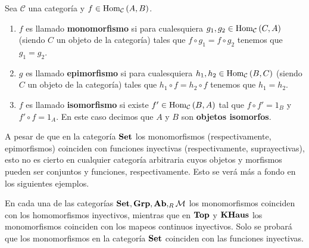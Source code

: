 \documentclass[12pt]{report}
\theoremstyle{largebreak}
\newcommand{\Hom}[3]{\ensuremath{\textup{Hom}_{#1}\left(#2,#3\right)}}
\newcommand{\Cat}[1]{\ensuremath{\textup{\textbf{#1}}}}
\begin{document}
    \begin{mydef}
        Sea $\mathcal{C}$ una categoría y $f\in\Hom{\mathcal{C}}{A}{B}$.
        \begin{enumerate}
            \item $f$ es llamado \textbf{monomorfismo} si para cualesquiera $g_1,g_2\in\Hom{\mathcal{C}}{C}{A}$ (siendo $C$ un objeto de la categoría) tales que $f\circ g_1=f\circ g_2$ tenemos que $g_1=g_2$.
            \item $g$ es llamado \textbf{epimorfismo} si para cualesquiera $h_1,h_2\in\Hom{\mathcal{C}}{B}{C}$ (siendo $C$ un objeto de la categoría) tales que $h_1\circ f=h_2\circ f$ tenemos que $h_1=h_2$.
            \item $f$ es llamado \textbf{isomorfismo} si existe $f'\in\Hom{\mathcal{C}}{B}{A}$ tal que $f\circ f'=1_B$ y $f'\circ f=1_A$. En este caso decimos que $A$ y $B$ son \textbf{objetos isomorfos}.
        \end{enumerate}
    \end{mydef}

    A pesar de que en la categoría $\Cat{Set}$ los monomorfismos (respectivamente, epimorfismos) coinciden con funciones inyectivas (respectivamente, suprayectivas), esto no es cierto en cualquier categoría arbitraria cuyos objetos y morfismos pueden ser conjuntos y funciones, respectivamente. Esto se verá más a fondo en los siguientes ejemplos.

    \begin{exa}
        En cada una de las categorías $\Cat{Set},\Cat{Grp},\Cat{Ab},_R\mathcal{M}$ los monomorfismos coinciden con los homomorfismos inyectivos, mientras que en $\Cat{Top}$ y $\Cat{KHaus}$ los monomorfismos coinciden con los mapeos continuos inyectivos. Solo se probará que los monomorfismos en la categoría $ \Cat{Set}$ coinciden con las funciones inyectivas.
    \end{exa}
\end{document}
